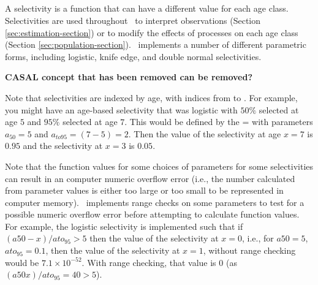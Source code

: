 \subsection{\label{sec:weightless-model}}

\subsection{\label{sec:maturity-notinpartition}}

\newpage

\subsection{\label{sec:selectivities}}

A selectivity is a function that can have a different value for each age class. Selectivities are used throughout \CNAME\ to interpret observations (Section \ref{sec:estimation-section}) or to modify the effects of processes on each age class (Section \ref{sec:population-section}). \CNAME\ implements a number of different parametric forms, including logistic, knife edge, and double normal selectivities.

\textbf{CASAL concept that has been removed can be removed?}



Note that selectivities are indexed by age, with indices from  to . For example, you might have an age-based selectivity that was logistic with $50\%$ selected at age $5$ and $95\%$ selected at age $7$. This would be defined by the = with parameters $a_{50}=5$ and $a_{to95}=(7-5)=2$. Then the value of the selectivity at age $x=7$ is $0.95$ and the selectivity at $x=3$ is $0.05$.

Note that the function values for some choices of parameters for some selectivities can result in an computer numeric overflow error (i.e., the number calculated from parameter values is either too large or too small to be represented in computer memory). \CNAME\ implements range checks on some parameters to test for a possible numeric overflow error before attempting to calculate function values. For example, the logistic selectivity is implemented such that if $(a50-x)/ato_95 > 5$ then the value of the selectivity at $x=0$, i.e., for $a50=5$, $ato_95=0.1$, then the value of the selectivity at $x=1$, without range checking would be $7.1 \times 10^{-52}$. With range checking, that value is $0$ (as $(a50 x)/ato_95=40 > 5$).

